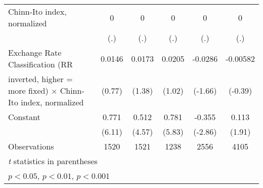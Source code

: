 {\begin{tabular}{l*{5}{c}}
\addlinespace
Chinn-Ito index, normalized             &    0         &    0         &    0         &    0         &    0         \\
                                        &  (.)         &  (.)         &  (.)         &  (.)         &  (.)         \\
\addlinespace
Exchange Rate Classification (RR        &0.0146         &0.0173         &0.0205         &-0.0286         &-0.00582         \\
inverted, higher = more fixed) $\times$ Chinn-Ito index, normalized&(0.77)         &(1.38)         &(1.02)         &(-1.66)         &(-0.39)         \\
\addlinespace
Constant                                &0.771\sym{***}&0.512\sym{***}&0.781\sym{***}&-0.355\sym{**} &0.113         \\
                                        &(6.11)         &(4.57)         &(5.83)         &(-2.86)         &(1.91)         \\
\midrule
Observations                            & 1520         & 1521         & 1238         & 2556         & 4105         \\
\bottomrule
\multicolumn{6}{l}{\footnotesize \textit{t} statistics in parentheses}\\
\multicolumn{6}{l}{\footnotesize \sym{*} \(p<0.05\), \sym{**} \(p<0.01\), \sym{***} \(p<0.001\)}\\
\end{tabular}
}
